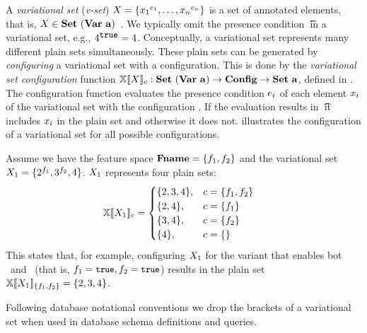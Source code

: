 A \emph{variational set} (\emph{v-set}) $\vset = \setDef {\annot [\dimMeta_1] {\elem_1},\ldots, \annot [\dimMeta_n] {\elem_n}}$ 
is a set of annotated elements, 
that is,
$\vset \in \vsetSet$~\cite{EWC13fosd,Walk14onward,ATW17dbpl}.
We typically omit the presence condition \t\ in a variational set,
e.g., $\annot [\t] 4 = 4$.
%
Conceptually, a variational set represents many different plain sets simultaneously.
These plain sets can be generated by \emph{configuring} a variational set with a configuration.
This is done by the \emph{variational set configuration} function
\ensuremath{\osetSem \vset: \vsetSet \to \confSet \to \psetSet}, defined in .
The configuration function evaluates the presence condition $\dimMeta_i$ of each 
element $\elem_i$ of the variational set with the configuration \config. 
If the evaluation results in \t\ it includes $\elem_i$ in the plain set and otherwise it
does not.  illustrates the configuration of a variational set for all
possible configurations. 

\begin{example}
\label{eg:vset-conf}
Assume we have the feature space $\fSet = \setDef {\A, \B}$ 
and the variational set $\vset_1 = \setDef {\annot [\A] 2, \annot [\B] 3, 4}$.
$\vset_1$ represents four plain sets:
\begin{alignat*}{1}
\osetSem {\vset_1} &=
\begin{cases}
  \setDef{2,3,4}, & \config = \setDef{\A,\B}\\
  \setDef{2,4}, & \config = \setDef{\A}\\
  \setDef{3,4}, & \config = \setDef{\B}\\
  \setDef{4}, & \config = \setDef { }
\end{cases}
\end{alignat*}
This states that, for example, configuring $\vset_1$ for the variant that enables 
bot \A\ and \B\ (that is, \ensuremath{\A = \t, \B = \t}) results in the plain set
\ensuremath{ \osetSem [\setDef {\A, \B}] {\vset_1} = \setDef {2,3,4} }.
\end{example}

%
Following database notational conventions
we drop the brackets of a variational set when used in database
schema definitions and queries.

